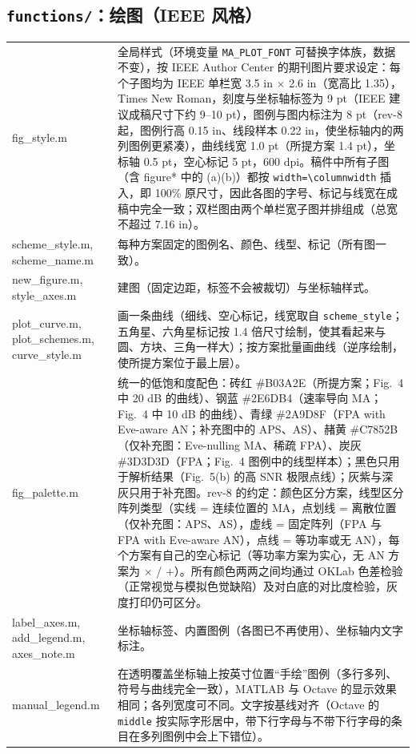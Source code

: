 \documentclass[11pt,a4paper]{ctexart}
\newcommand{\code}[1]{\texttt{#1}}
\begin{document}
\subsection{\code{functions/}：绘图（IEEE 风格）}
\begin{longtable}{>{\ttfamily\small}p{4.6cm}p{11.2cm}}
\toprule
fig\_style.m & 全局样式（环境变量 \code{MA\_PLOT\_FONT} 可替换字体族，数据不变），按 IEEE Author Center 的期刊图片要求设定：每个子图均为 IEEE 单栏宽 3.5 in $\times$ 2.6 in（宽高比 1.35），Times New Roman，刻度与坐标轴标签为 9 pt（IEEE 建议成稿尺寸下约 9--10 pt），图例与图内标注为 8 pt（rev-8 起，图例行高 0.15 in、线段样本 0.22 in，使坐标轴内的两列图例更紧凑），曲线线宽 1.0 pt（所提方案 1.4 pt），坐标轴 0.5 pt，空心标记 5 pt，600 dpi。稿件中所有子图（含 figure* 中的 (a)(b)）都按 \code{width=\textbackslash columnwidth} 插入，即 100\% 原尺寸，因此各图的字号、标记与线宽在成稿中完全一致；双栏图由两个单栏宽子图并排组成（总宽不超过 7.16 in）。\\
scheme\_style.m, scheme\_name.m & 每种方案固定的图例名、颜色、线型、标记（所有图一致）。\\
new\_figure.m, style\_axes.m & 建图（固定边距，标签不会被裁切）与坐标轴样式。\\
plot\_curve.m, plot\_schemes.m, curve\_style.m & 画一条曲线（细线、空心标记，线宽取自 \code{scheme\_style}；五角星、六角星标记按 1.4 倍尺寸绘制，使其看起来与圆、方块、三角一样大）；按方案批量画曲线（逆序绘制，使所提方案位于最上层）。\\
fig\_palette.m & 统一的低饱和度配色：砖红 \#B03A2E（所提方案；Fig.~4 中 20 dB 的曲线）、钢蓝 \#2E6DB4（速率导向 MA；Fig.~4 中 10 dB 的曲线）、青绿 \#2A9D8F（FPA with Eve-aware AN；补充图中的 APS、AS）、赭黄 \#C7852B（仅补充图：Eve-nulling MA、稀疏 FPA）、炭灰 \#3D3D3D（FPA；Fig.~4 图例中的线型样本）；黑色只用于解析结果（Fig.~5(b) 的高 SNR 极限点线）；灰紫与深灰只用于补充图。rev-8 的约定：颜色区分方案，线型区分阵列类型（实线 = 连续位置的 MA，点划线 = 离散位置（仅补充图：APS、AS），虚线 = 固定阵列（FPA 与 FPA with Eve-aware AN），点线 = 等功率或无 AN），每个方案有自己的空心标记（等功率方案为实心，无 AN 方案为 $\times$ / $+$）。所有颜色两两之间均通过 OKLab 色差检验（正常视觉与模拟色觉缺陷）及对白底的对比度检验，灰度打印仍可区分。\\
label\_axes.m, add\_legend.m, axes\_note.m & 坐标轴标签、内置图例（各图已不再使用）、坐标轴内文字标注。\\
manual\_legend.m & 在透明覆盖坐标轴上按英寸位置“手绘”图例（多行多列、符号与曲线完全一致），MATLAB 与 Octave 的显示效果相同；各列宽度可不同。文字按基线对齐（Octave 的 \code{middle} 按实际字形居中，带下行字母与不带下行字母的条目在多列图例中会上下错位）。\\

\end{longtable}
\end{document}
